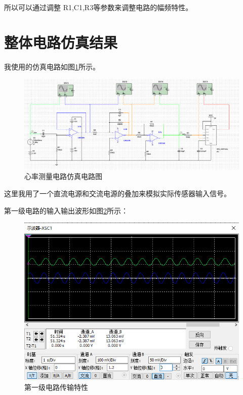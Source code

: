 \documentclass{article}
\begin{document}
\begin{spacing}{1.5}
    所以可以通过调整 R1,C1,R3等参数来调整电路的幅频特性。

\section{整体电路仿真结果}

    我使用的仿真电路如图\ref{fig:sim1}所示。

    \begin{figure}[H]
        \centering
        \includegraphics[scale=0.4]{fig/sim/sim1.png}
        \caption{心率测量电路仿真电路图}
        \label{fig:sim1}
    \end{figure}

    这里我用了一个直流电源和交流电源的叠加来模拟实际传感器输入信号。

    第一级电路的输入输出波形如图\ref{fig:sim1_result1}所示：
    \begin{figure}[H]
        \centering
        \includegraphics[scale=0.3]{fig/sim/sim1_result1.png}
        \caption{第一级电路传输特性}
        \label{fig:sim1_result1}
    \end{figure}
    

\end{spacing}
\end{document}
